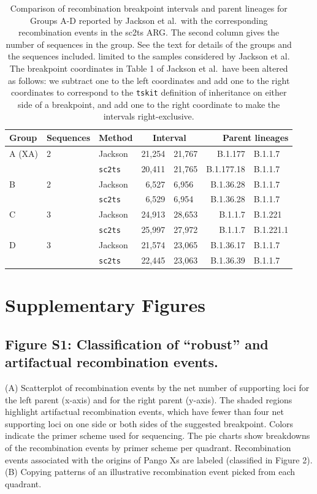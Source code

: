 \documentclass[12pt,letterpaper]{article}
\begin{document}
\begin{table} \centering
\caption{\label{tab:jackson}Comparison of recombination breakpoint
intervals and parent lineages for Groups A-D
reported by Jackson et al.\ with the corresponding
recombination events in the sc2ts ARG.
The second column gives the number of sequences in the group.
See the text for details of the groups and the sequences included.
limited to the samples considered by Jackson et al.
The breakpoint coordinates in Table 1 of Jackson et al.\ have been altered as follows: 
we subtract one to the left coordinates and add one to the right coordinates 
to correspond to the \texttt{tskit} definition of inheritance on either side of a breakpoint,
and add one to the right coordinate to make the intervals right-exclusive. }
\begin{tabular}{lllr@{--}lr@{+}l}
\toprule
Group        & Sequences & Method & \multicolumn{2}{c}{Interval}
    & \multicolumn{2}{r}{Parent lineages} \\
\midrule
A (XA)       & 2   & Jackson        &  21,254&21,767 & B.1.177&B.1.1.7 \\
             &     &\texttt{sc2ts} &  20,411&21,765 & B.1.177.18&B.1.1.7 \\
\cmidrule{3-7}
B            & 2   & Jackson        &  6,527&6,956 & B.1.36.28&B.1.1.7  \\
             &     &\texttt{sc2ts} &   6,529&6,954 & B.1.36.28&B.1.1.7  \\
\cmidrule{3-7}
C            & 3   &Jackson         &  24,913&28,653 &  B.1.1.7&B.1.221 \\
             &     & \texttt{sc2ts} &  25,997&27,972 &  B.1.1.7&B.1.221.1 \\
\cmidrule{3-7}
D            & 3   & Jackson        &  21,574&23,065 &  B.1.36.17&B.1.1.7 \\
             &     & \texttt{sc2ts} &  22,445&23,063 &  B.1.36.39&B.1.1.7 \\
\bottomrule
\end{tabular}
\end{table}


\section*{Supplementary Figures}

\subsection*{Figure S1: Classification of “robust” and artifactual recombination events.}
(A) Scatterplot of recombination events by the net number of supporting loci for the left parent (x-axis) and for the right parent (y-axis).
The shaded regions highlight artifactual recombination events,
which have fewer than four net supporting loci on one side or both sides of the suggested breakpoint.
Colors indicate the primer scheme used for sequencing.
The pie charts show breakdowns of the recombination events by primer scheme per quadrant.
Recombination events associated with the origins of Pango Xs are labeled (classified in Figure 2).
(B) Copying patterns of an illustrative recombination event picked from each quadrant.
\end{document}
